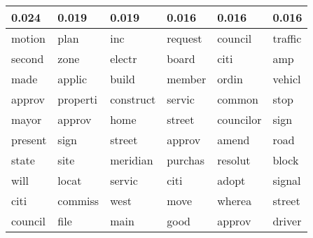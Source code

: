\begin{table}[ht]
\centering
\begin{tabular}{llllll}
  \hline
0.024 & 0.019 & 0.019 & 0.016 & 0.016 & 0.016 \\ 
  \hline
motion & plan & inc & request & council & \cellcolor{red!25} traffic \\ 
  second & \cellcolor{red!25} zone & electr & board & citi & amp \\ 
  made & applic & build & member & ordin & vehicl \\ 
  approv & \cellcolor{red!25} properti & construct & servic & common & stop \\ 
  mayor & approv & home & \cellcolor{red!25} street & councilor & sign \\ 
  present & sign & street & approv & amend & \cellcolor{red!25} road \\ 
  state & \cellcolor{red!25} site & meridian & purchas & resolut & block \\ 
  will & locat & servic & citi & adopt & signal \\ 
  citi & commiss & west & move & wherea & \cellcolor{red!25} street \\ 
  council & file & main & good & approv & driver \\ 
   \hline
\end{tabular}
\label{tabSTMINRep}
\end{table}

